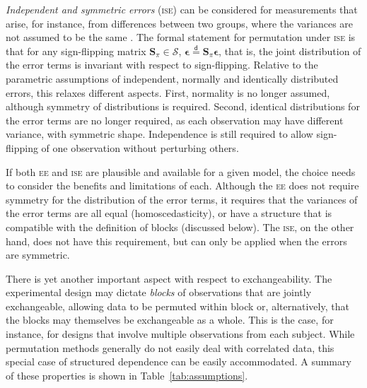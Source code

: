 \emph{Independent and symmetric errors} (\textsc{ise}) can be considered for measurements that arise, for instance, from differences between two groups, where the variances are not assumed to be the same \citep{Pesarin1995}. The formal statement for permutation under \textsc{ise} is that for any sign-flipping matrix $\mathbf{S}_{\pi} \in \mathcal{S}$, $\boldsymbol{\epsilon} \stackrel{\mathsf{d}}{=} \mathbf{S}_{\pi}\boldsymbol{\epsilon}$, that is, the joint distribution of the error terms is invariant with respect to sign-flipping. Relative to the parametric assumptions of independent, normally and identically distributed errors, this relaxes different aspects. First, normality is no longer assumed, although symmetry of distributions is required. Second, identical distributions for the error terms are no longer required, as each observation may have different variance, with symmetric shape. Independence is still required to allow sign-flipping of one observation without perturbing others.

If both \textsc{ee} and \textsc{ise} are plausible and available for a given model, the choice needs to consider the benefits and limitations of each. Although the \textsc{ee} does not require symmetry for the distribution of the error terms, it requires that the variances of the error terms are all equal (homoscedasticity), or have a structure that is compatible with the definition of blocks (discussed below). The \textsc{ise}, on the other hand, does not have this requirement, but can only be applied when the errors are symmetric.

There is yet another important aspect with respect to exchangeability. The experimental design may dictate \emph{blocks} of observations that are jointly exchangeable, allowing data to be permuted within block or, alternatively, that the blocks may themselves be exchangeable as a whole. This is the case, for instance, for designs that involve multiple observations from each subject. While permutation methods generally do not easily deal with correlated data, this special case of structured dependence can be easily accommodated. A summary of these properties is shown in Table~\ref{tab:assumptions}.

